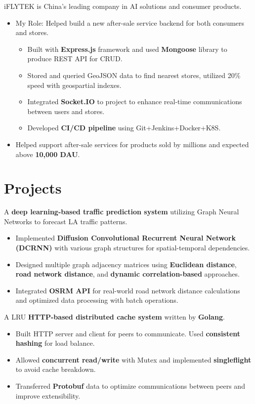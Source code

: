 \documentclass{resume}
\begin{document}
  iFLYTEK is China's leading company in AI solutions and consumer products.
\begin{itemize}
  \item My Role: Helped build a new after-sale service backend for both consumers and stores.
  \begin{itemize}
    \item Built with \textbf{Express.js} framework and used \textbf{Mongoose} library to produce REST API for CRUD.
    \item Stored and queried GeoJSON data to find nearest stores, utilized 20\% speed with geospartial indexes.
    \item Integrated \textbf{Socket.IO} to project to enhance real-time communications between users and stores.
    \item Developed \textbf{CI/CD pipeline} using Git+Jenkins+Docker+K8S.
  \end{itemize}
  \item Helped support after-sale services for products sold by millions and expected above \textbf{10,000 DAU}.
\end{itemize}

\section{Projects}

A \textbf{deep learning-based traffic prediction system} utilizing Graph Neural Networks to forecast LA traffic patterns.
\begin{itemize}
\item Implemented \textbf{Diffusion Convolutional Recurrent Neural Network (DCRNN)} with various graph structures for spatial-temporal dependencies.
\item Designed multiple graph adjacency matrices using \textbf{Euclidean distance}, \textbf{road network distance}, and \textbf{dynamic correlation-based} approaches.
\item Integrated \textbf{OSRM API} for real-world road network distance calculations and optimized data processing with batch operations.
\end{itemize}

  A LRU \textbf{HTTP-based distributed cache system} written by \textbf{Golang}.
\begin{itemize}
  \item Built HTTP server and client for peers to communicate. Used \textbf{consistent hashing} for load balance.
  \item Allowed \textbf{concurrent read/write} with Mutex and implemented \textbf{singleflight} to avoid cache breakdown.
  \item Transferred \textbf{Protobuf} data to optimize communications between peers and improve extensibility.
\end{itemize}
\end{document}

